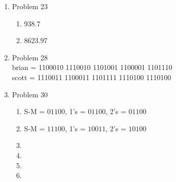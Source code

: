 \begin{enumerate}[leftmargin=2cm,labelsep=.5cm,label=\bf\arabic*.]
\item Problem 23
\begin{enumerate}
  \item 938.7
  \item 8623.97
\end{enumerate}

\item Problem 28\\
brian = 1100010 1110010 1101001 1100001 1101110\\
scott = 1110011 1100011 1101111 1110100 1110100\\[1cm]

\item Problem 30
\begin{enumerate}
  \item S-M = $01100$, 1's = $01100$, 2's = $01100$
  \item S-M = $11100$, 1's = $10011$, 2's = $10100$
  \item
  \item
  \item
  \item
\end{enumerate}

\end{enumerate}